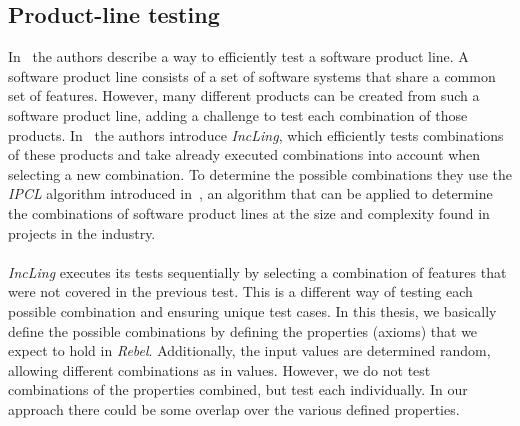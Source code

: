 \subsection{Product-line testing}
In~\cite{al2016incling} the authors describe a way to efficiently test a software product line. A software product line consists of a set of software systems that share a common set of features. However, many different products can be created from such a software product line, adding a challenge to test each combination of those products. In~\cite{al2016incling} the authors introduce \textit{IncLing}, which efficiently tests combinations of these products and take already executed combinations into account when selecting a new combination. To determine the possible combinations they use the \textit{IPCL} algorithm introduced in~\cite{johansen2012algorithm}, an algorithm that can be applied to determine the combinations of software product lines at the size and complexity found in projects in the industry.\\
\\
\textit{IncLing} executes its tests sequentially by selecting a combination of features that were not covered in the previous test. This is a different way of testing each possible combination and ensuring unique test cases. In this thesis, we basically define the possible combinations by defining the properties (axioms) that we expect to hold in \textit{Rebel}. Additionally, the input values are determined random, allowing different combinations as in values. However, we do not test combinations of the properties combined, but test each individually. In our approach there could be some overlap over the various defined properties.

